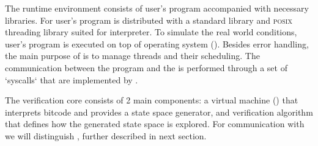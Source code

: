 The runtime environment consists of user's program accompanied with necessary
libraries. For user's program \DIVINE is distributed with a \Cpp{} standard
library and \textsc{posix} threading library suited for \DIVINE interpreter. To
simulate the real world conditions, user's program is executed on top of \DIVINE
operating system (\DIOS). Besides error handling, the main purpose of \DIOS is
to manage threads and their scheduling. The communication between the program and
the \DIOS is performed through a set of `syscalls` that are implemented by \DIOS.

The verification core consists of 2 main components: a \DIVINE virtual machine
(\DIVM) that interprets \LLVM bitcode and provides a state space generator, and
verification algorithm that defines how the generated state space is
explored. For communication with \DIVM we will distinguish ,
further described in next section.

